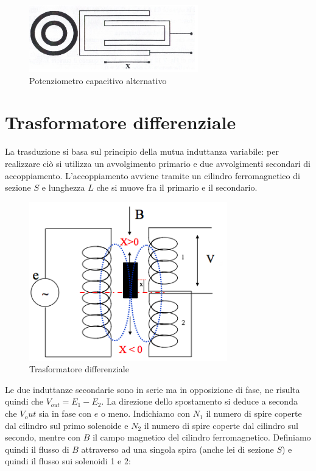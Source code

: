 \begin{figure}[htbp]
	\centering
	\includegraphics[scale=0.5]
			{img/potenziometro-capacitivo-2.png}
	\caption{Potenziometro
capacitivo alternativo\label{fig:potcapacitivoalt}}
\end{figure}

\section{Trasformatore differenziale}
La trasduzione si basa sul principio della mutua induttanza variabile:
per realizzare ciò si utilizza un avvolgimento primario e due
avvolgimenti secondari di accoppiamento. L'accoppiamento avviene
tramite un cilindro ferromagnetico di sezione $S$ e lunghezza $L$ che
si muove fra il primario e il secondario.

\begin{figure}[htbp]
	\centering
	\includegraphics[scale=0.5]
			{img/trasformatore-differenziale.png}
	\caption{Trasformatore differenziale\label{fig:trasdiff}}
\end{figure}

Le due induttanze secondarie sono in serie ma in opposizione di fase,
ne risulta quindi che $V_{out}=E_1-E_2$. La direzione dello
spostamento si deduce a seconda che $V_out$ sia in fase con $e$ o
meno. Indichiamo con $N_1$ il numero di spire coperte dal cilindro sul
primo solenoide e $N_2$ il numero di spire coperte dal cilindro sul
secondo, mentre con $B$ il campo magnetico del cilindro
ferromagnetico. Definiamo quindi il flusso di $B$ attraverso ad una
singola spira (anche lei di sezione $S$) e quindi il flusso sui
solenoidi 1 e 2:

